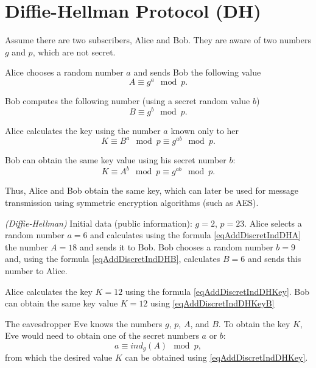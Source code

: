 \section{Diffie-Hellman Protocol (DH)}
\label{sec:add:dm:dh}
Assume there are two subscribers, Alice and Bob. They are aware of two numbers $g$ and $p$, which are not secret.

Alice chooses a random number $a$ and sends Bob the following value
\begin{equation}
A \equiv g^a \mod{p}.
\label{eqAddDiscretIndDHA}
\end{equation}

Bob computes the following number (using a secret random value $b$)
\begin{equation}
B \equiv g^b \mod{p}.
\label{eqAddDiscretIndDHB}
\end{equation}

Alice calculates the key using the number $a$ known only to her
\begin{equation}
K \equiv B^a\mod{p} \equiv g^{ab} \mod{p}.
\label{eqAddDiscretIndDHKey}
\end{equation}

Bob can obtain the same key value using his secret number $b$:
\begin{equation}
K \equiv A^b\mod{p} \equiv g^{ab} \mod{p}.
\label{eqAddDiscretIndDHKeyB}
\end{equation}

Thus, Alice and Bob obtain the same key, which can later be used for message transmission using symmetric encryption algorithms (such as AES). 

\begin{example}
\emph{(Diffie-Hellman)}
Initial data (public information): $g = 2$, $p = 23$. Alice selects a random number $a = 6$ and calculates using the formula \eqref{eqAddDiscretIndDHA} the number 
$A = 18$ and sends it to Bob.
Bob chooses a random number $b=9$ and, using the formula \eqref{eqAddDiscretIndDHB}, calculates
$B = 6$ and sends this number to Alice.

Alice calculates the key 
$K = 12$ using the formula \eqref{eqAddDiscretIndDHKey}. Bob can obtain the same key value 
$K = 12$ using \eqref{eqAddDiscretIndDHKeyB}
\nonumber
\end{example}

The eavesdropper Eve knows the numbers $g$, $p$, $A$, and $B$. To obtain the key $K$, Eve would need to obtain one of the secret numbers $a$ or $b$:
\begin{equation}
a \equiv ind_g\left( A \right) \mod{p},
\nonumber
\end{equation}
from which the desired value $K$ can be obtained using \eqref{eqAddDiscretIndDHKey}.